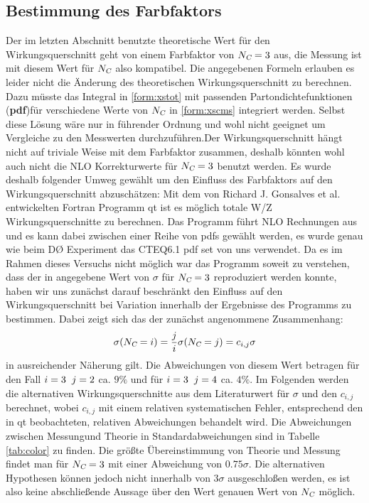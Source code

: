 \documentclass[a4paper,12pt]{article}
\begin{document}
\subsection{Bestimmung des Farbfaktors}
Der im letzten Abschnitt benutzte theoretische Wert für den Wirkungsquerschnitt geht von einem Farbfaktor von $N_{\textsl{C}}=3$ aus, die
Messung ist mit diesem Wert für $N_{\textsl{C}}$ also kompatibel. Die angegebenen Formeln erlauben es leider nicht die Änderung des theoretischen
Wirkungsquerschnitt zu berechnen. Dazu müsste das Integral in \ref{form:xstot} mit passenden  Partondichtefunktionen (\textbf{pdf})für verschiedene Werte
von $N_{\textsl{C}}$ in \ref{form:xscms} integriert werden. Selbst diese Lösung wäre nur in führender Ordnung und wohl nicht geeignet um Vergleiche
zu den Messwerten durchzuführen.Der Wirkungsquerschnitt hängt nicht auf triviale Weise mit dem Farbfaktor zusammen, deshalb könnten wohl auch nicht die 
NLO Korrekturwerte für $N_{\textsl{C}}=3$ benutzt werden. Es wurde deshalb folgender Umweg gewählt um den Einfluss des Farbfaktors auf den 
Wirkungsquerschnitt abzuschätzen:
Mit dem von Richard J. Gonsalves et al. entwickelten Fortran Programm qt \cite{qtsite} ist es möglich totale W/Z  Wirkungsquerschnitte
 zu berechnen. Das Programm führt NLO Rechnungen aus und es kann dabei zwischen einer Reihe von pdfs gewählt werden, es wurde genau wie beim
 DØ Experiment \cite{Abachi:1996ey} das CTEQ6.1 pdf set von uns verwendet. Da es im Rahmen dieses Versuchs nicht möglich war das Programm
 soweit zu verstehen, dass der in \cite{versuchsanleitung} angegebene Wert von $\sigma$ für $N_{\textsl{C}}=3$ reproduziert werden konnte, haben
 wir uns zunächst darauf beschränkt den Einfluss auf den Wirkungsquerschnitt bei Variation innerhalb der Ergebnisse des Programms zu bestimmen.
 Dabei zeigt sich das der zunächst angenommene Zusammenhang:
  \begin{align*}
	  \sigma (N_{\textsl{C}}= i) = \frac{j}{i} \sigma (N_{\textsl{C}}= j) = c_{i,j} \sigma
  \end{align*}
in ausreichender Näherung gilt. Die Abweichungen von diesem Wert betragen für den Fall $i=3 \hspace{0.2cm} j=2$ ca. $9\% $ und für $i=3 \hspace{0.2cm} j=4$ 
ca. $4\% $. Im Folgenden werden die alternativen Wirkungsquerschnitte aus dem Literaturwert für $\sigma $ und den $c_{i,j}$ berechnet,
wobei $c_{i,j}$ mit einem relativen systematischen Fehler, entsprechend den in qt beobachteten, relativen Abweichungen behandelt wird.
 Die Abweichungen zwischen Messungund Theorie in Standardabweichungen sind in Tabelle \ref{tab:color} zu finden. Die größte Übereinstimmung 
 von Theorie und Messung findet man für $N_{\textsl{C}}= 3$ mit einer Abweichung von $0.75\sigma$. Die alternativen Hypothesen können jedoch 
 nicht innerhalb von $3\sigma$ ausgeschloßen werden, es ist also keine abschließende Aussage über den Wert genauen Wert von $N_{\textsl{C}}$ möglich.
\end{document}
